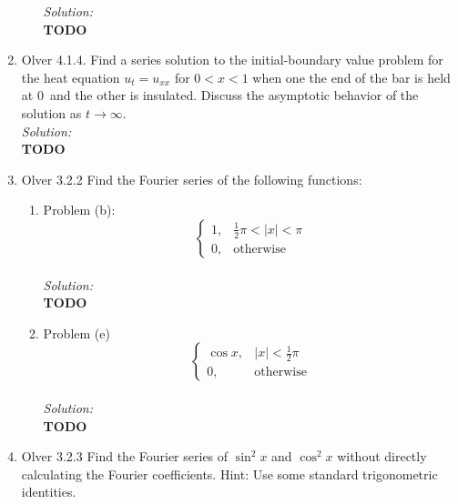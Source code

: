 \documentclass[10pt]{amsart}
\theoremstyle{nonumberplain}
\begin{document}
\begin{enumerate}[label={\bf {\arabic*}:}]
\begin{enumerate}
\noindent
\textit{Solution:} \\
\textbf{TODO} \\

\end{enumerate}

\newpage

\item Olver 4.1.4. Find a series solution to the initial-boundary value problem for the heat equation $u_t = u_{xx}$ for $0 < x < 1$ when one the end of the bar is held at 0\textdegree \, and the other is insulated.
Discuss the asymptotic behavior of the solution as $t \rightarrow \infty$. \\

\noindent
\textit{Solution:} \\
\textbf{TODO} \\

\newpage

\item Olver 3.2.2 Find the Fourier series of the following functions:
\begin{enumerate}

\item Problem (b):
$$
\begin{cases}
1, &\frac 1 2 \pi < |x| < \pi \\
0, &\text{otherwise}
\end{cases}
$$ \\

\noindent
\textit{Solution:} \\
\textbf{TODO} \\

\item Problem (e)
$$
\begin{cases}
\cos x, & |x| < \frac 1 2 \pi \\
0, &\text{otherwise}
\end{cases}
$$ \\

\noindent
\textit{Solution:} \\
\textbf{TODO} \\

\end{enumerate}
\newpage

\item Olver 3.2.3 Find the Fourier series of $\sin^2 x$ and $\cos^2 x$ without directly calculating the Fourier coefficients.
Hint: Use some standard trigonometric identities.\\


\end{enumerate}
\end{document}
